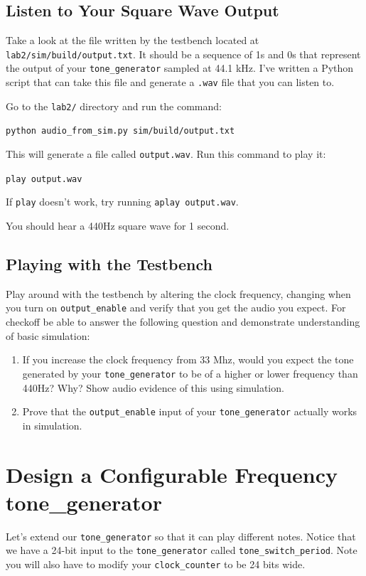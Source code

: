 \documentclass[11pt]{article}
\begin{document}
\subsection{Listen to Your Square Wave Output}

Take a look at the file written by the testbench located at \verb|lab2/sim/build/output.txt|. It should be a sequence of 1s and 0s that represent the output of your \verb|tone_generator| sampled at 44.1 kHz. I've written a Python script that can take this file and generate a \verb|.wav| file that you can listen to.

Go to the \verb|lab2/| directory and run the command:

\verb|python audio_from_sim.py sim/build/output.txt|

This will generate a file called \verb|output.wav|. Run this command to play it:

\verb|play output.wav|

If \verb|play| doesn't work, try running \verb|aplay output.wav|.

You should hear a 440Hz square wave for 1 second.

\subsection{Playing with the Testbench}

Play around with the testbench by altering the clock frequency, changing when you turn on \verb|output_enable| and verify that you get the audio you expect. For checkoff be able to answer the following question and demonstrate understanding of basic simulation:

\begin{enumerate}
	\item If you increase the clock frequency from 33 Mhz, would you expect the tone generated by your \verb|tone_generator| to be of a higher or lower frequency than 440Hz? Why? Show audio evidence of this using simulation.
	\item Prove that the \verb|output_enable| input of your \verb|tone_generator| actually works in simulation.
\end{enumerate}

\section{Design a Configurable Frequency tone\_generator}

Let's extend our \verb|tone_generator| so that it can play different notes. Notice that we have a 24-bit input to the \verb|tone_generator| called \verb|tone_switch_period|. Note you will also have to modify your \verb|clock_counter| to be 24 bits wide.
\end{document}
